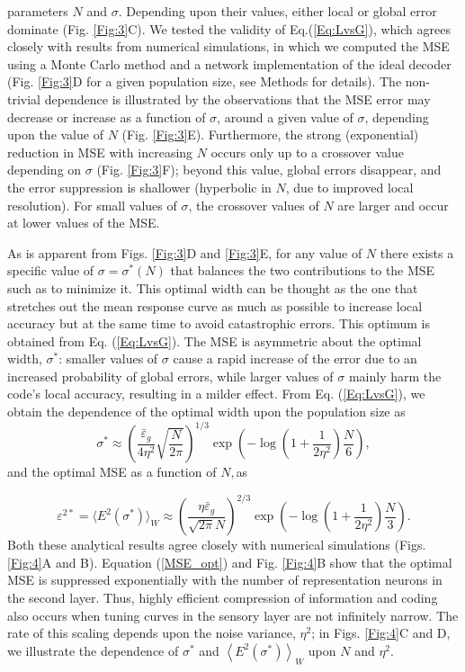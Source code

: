 \documentclass[a4paper]{article}%
\begin{document}
parameters $N$ and $\sigma$. Depending upon their values, either local or
global error dominate (Fig. \ref{Fig:3}C). We tested the validity of Eq.(\ref{Eq:LvsG}),  which agrees closely with results from
numerical simulations, in which we computed the MSE using a Monte Carlo method
and a network implementation of the ideal decoder (Fig. \ref{Fig:3}D for a given population size, see Methods for details).
The non-trivial
dependence is illustrated by the observations that the MSE error may decrease
or increase as a function of $\sigma$, around a given value of $\sigma$,
depending upon the value of $N$ (Fig. \ref{Fig:3}E). Furthermore, the strong (exponential) reduction in MSE with
increasing $N$ occurs only up to a crossover value depending on $\sigma$ (Fig.
\ref{Fig:3}F); beyond this value,
global errors disappear, and the error suppression is shallower (hyperbolic in
$N$, due to improved local resolution). For small values of $\sigma$, the
crossover values of $N$ are larger and occur at lower values of the MSE.

As is apparent from Figs. \ref{Fig:3}D and \ref{Fig:3}E, for any value of $N$ there exists a specific value of
$\sigma=\sigma^{\ast}\left(  N\right)  $ that balances the two contributions
to the MSE such as to minimize it. This optimal width can be thought as the
one that stretches out the mean response curve as much as possible to increase
local accuracy but at the same time to avoid catastrophic errors. This optimum
is obtained from Eq. (\ref{Eq:LvsG}). The MSE is
asymmetric about the optimal width, $\sigma^{\ast}$: smaller values of
$\sigma$ cause a rapid increase of the error due to an increased probability
of global errors, while larger values of $\sigma$ mainly harm the code's local
accuracy, resulting in a milder effect. From Eq. (\ref{Eq:LvsG}), we obtain
the dependence of the optimal width upon the population size as
\begin{equation}
\sigma^{\ast}\approx\left(  \frac{\bar{\varepsilon}_{g}}{4\eta^{2}}\sqrt
{\frac{N}{2\pi}}\right)  ^{1/3}\exp\left(  {-\log\left(  {1+\frac{1}{2\eta
^{2}}}\right)  \frac{N}{6}}\right)  ,
\label{Sigma_opt}
\end{equation}
and the optimal MSE as a function of $N,$as 

\begin{equation}
\varepsilon^{2*}= \langle E^2(\sigma^*) \rangle_W \approx  \left( \frac{  \eta \bar{\varepsilon}_g }{\sqrt{2\pi}N}\right)^{2/3} \exp{\left(- \log \left( 1 + \frac{1}{2\eta^2} \right) \frac{N}{3}\right)}.
\label{MSE_opt}
\end{equation}
Both these analytical results agree
closely with numerical simulations (Figs. \ref{Fig:4}A and B). Equation
(\ref{MSE_opt}) and Fig. \ref{Fig:4}B
show that the optimal MSE is suppressed exponentially with the number of
representation neurons in the second layer. Thus, highly efficient compression
of information and coding also occurs when tuning curves in the sensory layer
are not infinitely narrow. The rate of this scaling depends upon the noise
variance, $\eta^{2}$; in Figs. \ref{Fig:4}C and D, we illustrate the dependence of $\sigma^{\ast}$ and
$\left\langle E^{2}(\sigma^{\ast})\right\rangle _{W}$ upon $N$ and
$\eta^{2}$.
\end{document}
